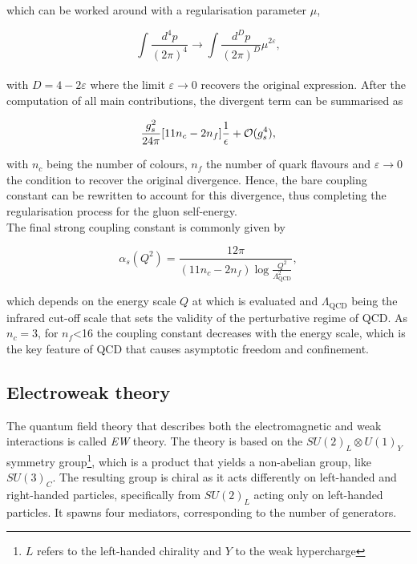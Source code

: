 which can be worked around with a regularisation parameter $\mu$,

\begin{equation*}
    \int \frac{d^4p}{(2\pi)^4}\to \int \frac{d^Dp}{(2\pi)^D}\mu^{2\varepsilon},
\end{equation*}\\

with $D=4-2\varepsilon$ where the limit $\varepsilon\to 0$ recovers the original expression. After the computation of all main contributions, the divergent term can be summarised as

\begin{equation}
    \frac{g_s^2}{24\pi}\qty[11n_c-2 n_f]\frac{1}{\epsilon}+\mathcal{O}(g_s^4),
\end{equation}

with $n_c$ being the number of colours, $n_f$ the number of quark flavours and $\varepsilon\to 0$ the condition to recover the original divergence. Hence, the bare coupling constant can be rewritten to account for this divergence, thus completing the regularisation process for the gluon self-energy.\\

The final strong coupling constant is commonly given by 

\begin{equation}
    \label{Theory_eq:runningcoupling}
    \alpha_s(Q^2) = \frac{12\pi}{(11n_c - 2 n_f)\log \frac{Q^2}{\Lambda^2_\text{QCD}}},
\end{equation}

which depends on the energy scale $Q$ at which is evaluated and $\Lambda_\text{QCD}$ being the infrared cut-off scale that sets the validity of the perturbative regime of \acrshort{QCD}. As $n_c=3$, for $n_f$<16 the coupling constant decreases with the energy scale, which is the key feature of \acrshort{QCD} that causes asymptotic freedom and confinement.

\subsection{Electroweak theory}

The quantum field theory that describes both the electromagnetic and weak interactions is called \textit{\acrlong{EW}} theory. The theory is based on the $SU(2)_L\otimes U(1)_Y$ symmetry group\footnote{$L$ refers to the left-handed chirality and $Y$ to the weak hypercharge}, which is a product that yields a non-abelian group, like $SU(3)_C$. The resulting group is chiral as it acts differently on left-handed and right-handed particles, specifically from $SU(2)_L$ acting only on left-handed particles. It spawns four mediators, corresponding to the number of generators.\\

